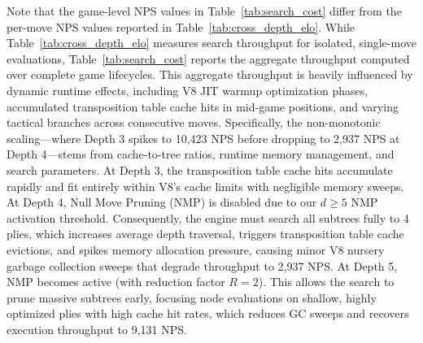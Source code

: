 Note that the game-level NPS values in Table~\ref{tab:search_cost} differ from the per-move NPS values reported in Table~\ref{tab:cross_depth_elo}. While Table~\ref{tab:cross_depth_elo} measures search throughput for isolated, single-move evaluations, Table~\ref{tab:search_cost} reports the aggregate throughput computed over complete game lifecycles. This aggregate throughput is heavily influenced by dynamic runtime effects, including V8 JIT warmup optimization phases, accumulated transposition table cache hits in mid-game positions, and varying tactical branches across consecutive moves. Specifically, the non-monotonic scaling—where Depth 3 spikes to 10,423 NPS before dropping to 2,937 NPS at Depth 4—stems from cache-to-tree ratios, runtime memory management, and search parameters. At Depth 3, the transposition table cache hits accumulate rapidly and fit entirely within V8's cache limits with negligible memory sweeps. At Depth 4, Null Move Pruning (NMP) is disabled due to our $d \ge 5$ NMP activation threshold. Consequently, the engine must search all subtrees fully to 4 plies, which increases average depth traversal, triggers transposition table cache evictions, and spikes memory allocation pressure, causing minor V8 nursery garbage collection sweeps that degrade throughput to 2,937 NPS. At Depth 5, NMP becomes active (with reduction factor $R = 2$). This allows the search to prune massive subtrees early, focusing node evaluations on shallow, highly optimized plies with high cache hit rates, which reduces GC sweeps and recovers execution throughput to 9,131 NPS.


